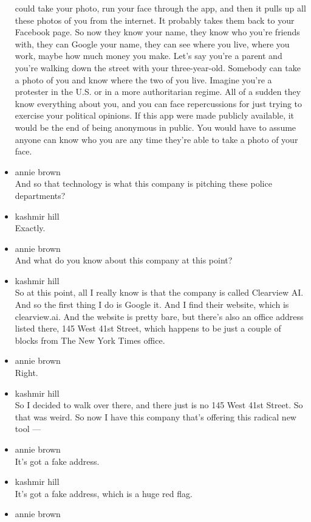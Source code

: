 \begin{itemize}
  could take your photo, run your face through the app, and then it
  pulls up all these photos of you from the internet. It probably takes
  them back to your Facebook page. So now they know your name, they know
  who you're friends with, they can Google your name, they can see where
  you live, where you work, maybe how much money you make. Let's say
  you're a parent and you're walking down the street with your
  three-year-old. Somebody can take a photo of you and know where the
  two of you live. Imagine you're a protester in the U.S. or in a more
  authoritarian regime. All of a sudden they know everything about you,
  and you can face repercussions for just trying to exercise your
  political opinions. If this app were made publicly available, it would
  be the end of being anonymous in public. You would have to assume
  anyone can know who you are any time they're able to take a photo of
  your face.
\item
  annie brown\\
  And so that technology is what this company is pitching these police
  departments?
\item
  kashmir hill\\
  Exactly.
\item
  annie brown\\
  And what do you know about this company at this point?
\item
  kashmir hill\\
  So at this point, all I really know is that the company is called
  Clearview AI. And so the first thing I do is Google it. And I find
  their website, which is clearview.ai. And the website is pretty bare,
  but there's also an office address listed there, 145 West 41st Street,
  which happens to be just a couple of blocks from The New York Times
  office.
\item
  annie brown\\
  Right.
\item
  kashmir hill\\
  So I decided to walk over there, and there just is no 145 West 41st
  Street. So that was weird. So now I have this company that's offering
  this radical new tool ---
\item
  annie brown\\
  It's got a fake address.
\item
  kashmir hill\\
  It's got a fake address, which is a huge red flag.
\item
  annie brown\\

\end{itemize}
